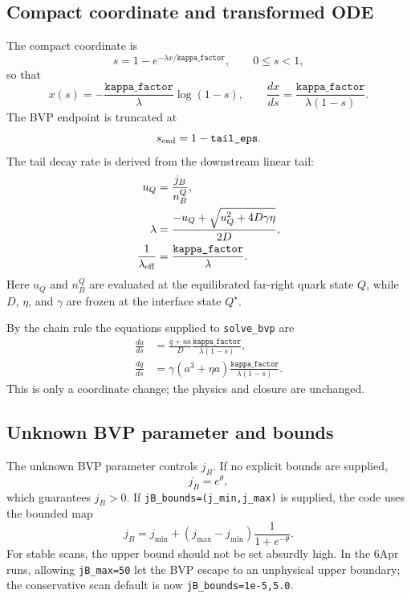 \documentclass[11pt]{article}
\begin{document}
\subsection{Compact coordinate and transformed ODE}
The compact coordinate is
\begin{equation}
s = 1-e^{-\lambda x/\texttt{kappa\_factor}}, \qquad 0\le s < 1,
\end{equation}
so that
\begin{equation}
x(s)=-\frac{\texttt{kappa\_factor}}{\lambda}\log(1-s),\qquad
\frac{dx}{ds}=\frac{\texttt{kappa\_factor}}{\lambda(1-s)}.
\end{equation}
The BVP endpoint is truncated at
\begin{equation}
s_{\rm end}=1-\texttt{tail\_eps}.
\end{equation}
The tail decay rate is derived from the downstream linear tail:
\begin{align}
u_Q &= \frac{j_B}{n_B^Q},\\
\lambda &= \frac{-u_Q+\sqrt{u_Q^2+4D\gamma\eta}}{2D},\\
\frac{1}{\lambda_{\rm eff}} &= \frac{\texttt{kappa\_factor}}{\lambda}.
\end{align}
Here $u_Q$ and $n_B^Q$ are evaluated at the equilibrated far-right quark state
$Q$, while $D$, $\eta$, and $\gamma$ are frozen at the interface state
$Q^\star$.

By the chain rule the equations supplied to \texttt{solve\_bvp} are
\begin{align}
\frac{da}{ds}
&= \frac{q+u a}{D}\frac{\texttt{kappa\_factor}}{\lambda(1-s)},\\
\frac{dq}{ds}
&= \gamma(a^3+\eta a)\frac{\texttt{kappa\_factor}}{\lambda(1-s)}.
\end{align}
This is only a coordinate change; the physics and closure are unchanged.

\subsection{Unknown BVP parameter and bounds}
The unknown BVP parameter controls $j_B$. If no explicit bounds are supplied,
\begin{equation}
j_B=e^\theta,
\end{equation}
which guarantees $j_B>0$. If \texttt{jB\_bounds=(j\_min,j\_max)} is supplied,
the code uses the bounded map
\begin{equation}
j_B=j_{\min}+(j_{\max}-j_{\min})\frac{1}{1+e^{-\theta}}.
\end{equation}
For stable scans, the upper bound should not be set absurdly high. In the 6Apr
runs, allowing \texttt{jB\_max=50} let the BVP escape to an unphysical upper
boundary; the conservative scan default is now \texttt{jB\_bounds=1e-5,5.0}.
\end{document}
